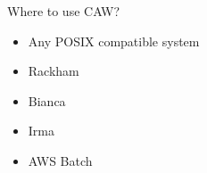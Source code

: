 \documentclass{beamer}
\begin{document}
\begin{frame}{Where to use CAW?}
	\begin{center}
	\end{center}
	\begin{itemize}
		\item<1> Any POSIX compatible system
		\pause
		\item<-5> Rackham
		\pause
		\item<-5> Bianca
		\pause
		\item<-5> Irma
		\pause
		\item<6> AWS Batch
	\end{itemize}
\end{frame}
\end{document}
